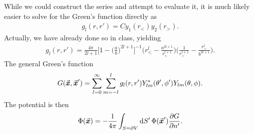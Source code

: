 {While we could construct the series and attempt to evaluate it, it is much likely easier to solve for the Green's function directly as
\begin{eqnarray}
    g_{l}(r,r') = C y_1(r_{<}) y_2(r_{>})
.\end{eqnarray}
Actually, we have already done so in class, yielding
\begin{eqnarray}
    g_{l}(r,r') = \frac{4\pi}{2l+1} \Big[ 1 - \Big( \frac{a}{b} \Big)^{2l+1} \Big]^{-1} \Big( r_{<}^{l} - \frac{a^{2l+1}}{r_{<}^{l+1}} \Big) \Big( \frac{1}{r_{>}^{l+1}} - \frac{r_{>}^{l}}{b^{2l+1}} \Big)
.\end{eqnarray}
The general Green's function
\begin{eqnarray}
    G(\va*{x},\va*{x}') = \sum_{l=0}^{\infty} \sum_{m=-l}^{l} g_{l}(r,r') Y_{lm}^{*}(\theta',\phi') Y_{lm}(\theta,\phi)
.\end{eqnarray}
The potential is then
\begin{eqnarray}
    \Phi(\va*{x}) = -\frac{1}{4\pi} \int_{S = \partial V} \dd{S'} \Phi(\va*{x}') \pdv{G}{n'}
.\end{eqnarray}

}
